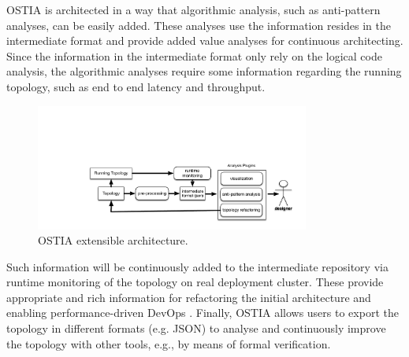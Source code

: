 OSTIA is architected in a way that algorithmic analysis, such as anti-pattern
analyses, can be easily added. These analyses use the information resides in the
intermediate format and provide added value analyses for continuous architecting. Since the information in the intermediate format only rely
on the logical code analysis, the algorithmic analyses require some
information regarding the running topology, such as end to end latency and
throughput.

\begin{figure}[H]
	\begin{center}
		\includegraphics[width=9cm]{images/ostia-arch}
		\caption{OSTIA extensible architecture.}\label{archostia}
	\end{center}
\end{figure}

Such information will be continuously added to the intermediate repository via
runtime monitoring of the topology on real deployment cluster. These provide
appropriate and rich information for refactoring the initial architecture and
enabling performance-driven DevOps \cite{brunnert2015performance}.
Finally, OSTIA allows users to export the topology in different formats
(e.g. JSON) to analyse and continuously improve the topology with other tools, e.g., by means of formal verification.

